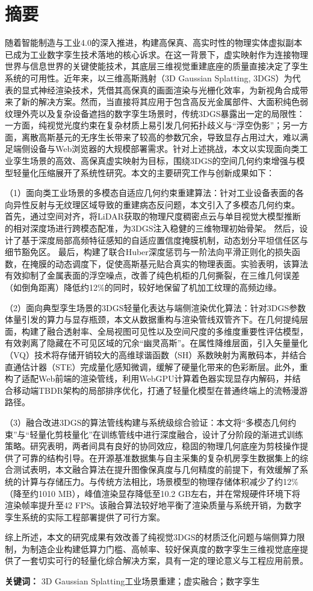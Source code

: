 \clearpage
{}
\chapter*{摘\quad 要} 

随着智能制造与工业4.0的深入推进，构建高保真、高实时性的物理实体虚拟副本已成为工业数字孪生技术落地的核心诉求。在这一背景下，虚实映射作为连接物理世界与信息世界的关键使能技术，其底层三维视觉重建底座的质量直接决定了孪生系统的可用性。近年来，以三维高斯溅射（3D Gaussian Splatting, 3DGS）为代表的显式神经渲染技术，凭借其高保真的画面渲染与光栅化效率，为新视角合成带来了新的解决方案。然而，当直接将其应用于包含高反光金属部件、大面积纯色弱纹理外壳以及复杂设备遮挡的数字孪生场景时，传统3DGS暴露出一定的局限性：一方面，纯视觉光度约束在复杂材质上易引发几何拓扑歧义与“浮空伪影”；另一方面，离散高斯基元的无序生长带来了较高的参数冗余，导致显存占用过大，难以满足端侧设备与Web浏览器的大规模部署需求。针对上述挑战，本文以实现面向类工业孪生场景的高效、高保真虚实映射为目标，围绕3DGS的空间几何约束增强与模型轻量化压缩展开了系统性研究。本文的主要研究工作与创新成果如下：

（1）面向类工业场景的多模态自适应几何约束重建算法：针对工业设备表面的各向异性反射与无纹理区域导致的重建病态反问题，本文引入了多模态几何约束。
首先，通过空间对齐，将LiDAR获取的物理尺度稠密点云与单目视觉大模型推断的相对深度场进行跨模态配准，为3DGS注入稳健的三维物理初始骨架。
然后，设计了基于深度局部高频特征感知的自适应置信度掩膜机制，动态划分平坦信任区与细节豁免区。
最后，构建了联合Huber深度惩罚与一阶法向平滑正则化的损失函数，在掩膜的动态调度下，促使高斯基元贴合真实的物理表面。实验表明，该算法有效抑制了金属表面的浮空噪点，改善了纯色机柜的几何撕裂，在三维几何误差（如倒角距离）降低约12\%的同时，较好地保留了机加工纹理的高频边缘。

（2）面向典型孪生场景的3DGS轻量化表达与端侧渲染优化算法：针对3DGS参数体量引发的算力与显存瓶颈，本文从数据重构与渲染管线双管齐下。在几何提纯层面，构建了融合透射率、全局视图可见性以及空间尺度的多维度重要性评估模型，有效剥离了隐藏在不可见区域的冗余“幽灵高斯”。在属性降维层面，引入矢量量化（VQ）技术将存储开销较大的高维球谐函数（SH）系数映射为离散码本，并结合直通估计器（STE）完成量化感知微调，缓解了硬量化带来的色彩断层。此外，重构了适配Web前端的渲染管线，利用WebGPU计算着色器实现显存内解码，并结合移动端TBDR架构的局部排序优化，打通了轻量化模型在普通终端上的流畅漫游路径。

（3）融合改进3DGS的算法管线构建与系统级综合验证：本文将“多模态几何约束”与“轻量化剪枝量化”在训练管线中进行深度融合，设计了分阶段的渐进式训练策略。研究表明，两者间具有良好的协同效应，稳固的物理几何底座为剪枝操作提供了可靠的结构引导。在开源基准数据集与自主采集的复杂机房孪生数据集上的综合测试表明，本文融合算法在提升图像保真度与几何精度的前提下，有效缓解了系统的计算与存储压力。与传统方法相比，场景模型的物理存储体积减少了约12\%（降至约1010 MB），峰值渲染显存降低至10.2 GB左右，并在常规硬件环境下将渲染帧率提升至42 FPS。该融合算法较好地平衡了渲染质量与系统开销，为数字孪生系统的实际工程部署提供了可行方案。

综上所述，本文的研究成果有效改善了纯视觉3DGS的材质泛化问题与端侧算力限制，为制造企业构建低算力门槛、高帧率、较好保真度的数字孪生三维视觉底座提供了一套切实可行的轻量化综合解决方案，具有一定的理论意义与工程应用前景。

\vspace{1em}
\noindent\textbf{关键词：} 3D Gaussian Splatting工业场景重建；虚实融合；数字孪生
